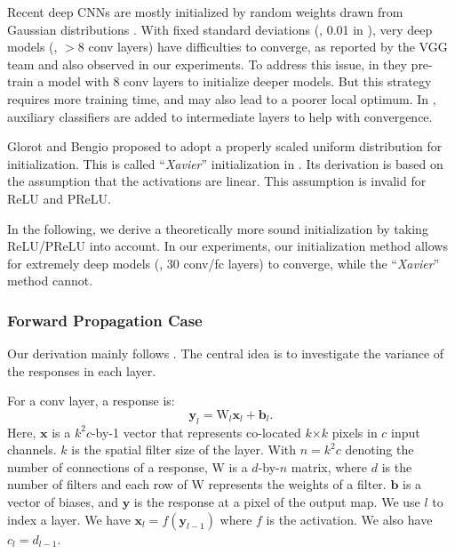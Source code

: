 \documentclass[10pt,twocolumn,letterpaper]{article}
\newcommand{\ve}[1]{\mathbf{#1}} %
\newcommand{\ma}[1]{\mathrm{#1}} %
\begin{document}
Recent deep CNNs are mostly initialized by random weights drawn from Gaussian distributions \cite{Krizhevsky2012}.
With fixed standard deviations (\eg, 0.01 in \cite{Krizhevsky2012}),
very deep models (\eg, $>$8 conv layers) have difficulties to converge, as reported by the VGG team \cite{Simonyan2014} and also observed in our experiments. To address this issue, in \cite{Simonyan2014} they pre-train a model with 8 conv layers to initialize deeper models. But this strategy requires more training time, and may also lead to a poorer local optimum. In \cite{Szegedy2014,Lee2014}, auxiliary classifiers are added to intermediate layers to help with convergence.

Glorot and Bengio \cite{Glorot2010} proposed to adopt a properly scaled uniform distribution for initialization. This is called ``\emph{Xavier}'' initialization in \cite{Jia2014}. Its derivation is based on the assumption that the activations are linear. This assumption is invalid for ReLU and PReLU.

In the following, we derive a theoretically more sound initialization by taking ReLU/PReLU into account. In our experiments, our initialization method allows for extremely deep models (\eg, 30 conv/fc layers) to converge, while the ``\emph{Xavier}'' method \cite{Glorot2010} cannot.


\subsubsection*{Forward Propagation Case}

Our derivation mainly follows \cite{Glorot2010}. The central idea is to investigate the variance of the responses in each layer.

For a conv layer, a response is:
\begin{equation}\label{eq:forward}
\ve{y}_l=\ma{W}_l\ve{x}_l + \ve{b}_l.
\end{equation}
Here, $\ve{x}$ is a $k^2c$-by-1 vector that
represents co-located $k$$\times$$k$ pixels in $c$ input channels. $k$ is the spatial filter size of the layer. With $n=k^2c$ denoting the number of connections of a response, $\ma{W}$ is a $d$-by-$n$ matrix, where $d$ is the number of filters and each row of $\ma{W}$ represents the weights of a filter. $\ve{b}$ is a vector of biases, and $\ve{y}$ is the response at a pixel of the output map.
We use $l$ to index a layer. We have
$\ve{x}_{l}=f(\ve{y}_{l-1})$
where $f$ is the activation. We also have $c_l = d_{l-1}$. 
\end{document}
